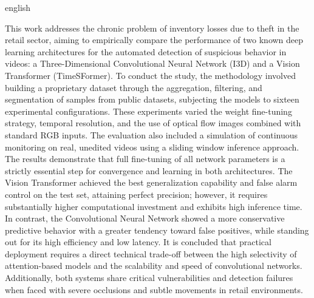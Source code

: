 \documentclass[12pt, %
openright, 
oneside, %
a4paper,    %
brazil]{facom-ufu-abntex2}
\begin{document}
\begin{resumo}[Abstract] %
 \begin{otherlanguage*}{english}

This work addresses the chronic problem of inventory losses due to theft in the retail sector, aiming to empirically compare the performance of two known deep learning architectures for the automated detection of suspicious behavior in videos: a Three-Dimensional Convolutional Neural Network (I3D) and a Vision Transformer (TimeSFormer). To conduct the study, the methodology involved building a proprietary dataset through the aggregation, filtering, and segmentation of samples from public datasets, subjecting the models to sixteen experimental configurations. These experiments varied the weight fine-tuning strategy, temporal resolution, and the use of optical flow images combined with standard RGB inputs. The evaluation also included a simulation of continuous monitoring on real, unedited videos using a sliding window inference approach. The results demonstrate that full fine-tuning of all network parameters is a strictly essential step for convergence and learning in both architectures. The Vision Transformer achieved the best generalization capability and false alarm control on the test set, attaining perfect precision; however, it requires substantially higher computational investment and exhibits high inference time. In contrast, the Convolutional Neural Network showed a more conservative predictive behavior with a greater tendency toward false positives, while standing out for its high efficiency and low latency. It is concluded that practical deployment requires a direct technical trade-off between the high selectivity of attention-based models and the scalability and speed of convolutional networks. Additionally, both systems share critical vulnerabilities and detection failures when faced with severe occlusions and subtle movements in retail environments.

  \vspace{\onelineskip}

  \noindent
 \end{otherlanguage*}
\end{resumo}

\listoffigures*
\cleardoublepage

\listoftables*
\cleardoublepage
\end{document}
